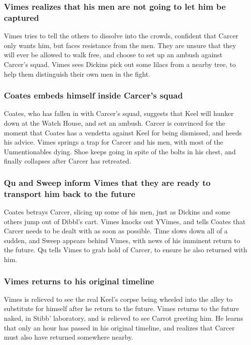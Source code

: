 \subsubsection{\Gls{Vimes} realizes that his men are not going to let him be captured}
\Gls{Vimes} tries to tell the others to dissolve into the crowds, confident that \Gls{Carcer} only
wants him, but faces resistance from the men. They are unsure that they will ever be allowed to
walk free, and choose to set up an ambush against \Gls{Carcer}'s squad. \Gls{Vimes} sees
\Gls{Dickins} pick out some lilacs from a nearby tree, to help them distinguish their own men in
the fight.

\subsubsection{\Gls{Coates} embeds himself inside \Gls{Carcer}'s squad}
\Gls{Coates}, who has fallen in with \Gls{Carcer}'s squad, suggests that \Gls{Keel} will hunker down
at the Watch House, and set an ambush. \Gls{Carcer} is convinced for the moment that \Gls{Coates}
has a vendetta against \Gls{Keel} for being dismissed, and heeds his advice. \Gls{Vimes} springs
a trap for \Gls{Carcer} and his men, with most of the Unmentionables dying. \Gls{Shoe} keeps going
in spite of the bolts in his chest, and finally collapses after \Gls{Carcer} has retreated.

\subsubsection{\Gls{Qu} and \Gls{Sweep} inform \Gls{Vimes} that they are ready to transport him
    back to the future}
\Gls{Coates} betrays \Gls{Carcer}, slicing up some of his men, just as \Gls{Dickins} and some others
jump out of \Gls{Dibbl}'s cart. \Gls{Vimes} knocks out \Gls{YVimes}, and tells \Gls{Coates} that
\Gls{Carcer} needs to be dealt with as soon as possible. Time slows down all of a sudden, and
\Gls{Sweep} appears behind \Gls{Vimes}, with news of his imminent return to the future. \Gls{Qu}
tells \Gls{Vimes} to grab hold of \Gls{Carcer}, to ensure he also returned with him.

\subsubsection{\Gls{Vimes} returns to his original timeline}
\Gls{Vimes} is relieved to see the real \Gls{Keel}'s corpse being wheeled into the alley to
substitute for himself after he return to the future. \Gls{Vimes} returns to the future naked, in
\Gls{Stibb}' laboratory, and is relieved to see \Gls{Carrot} greeting him. He learns that only an
hour has passed in his original timeline, and realizes that \Gls{Carcer} must also have returned
somewhere nearby.

